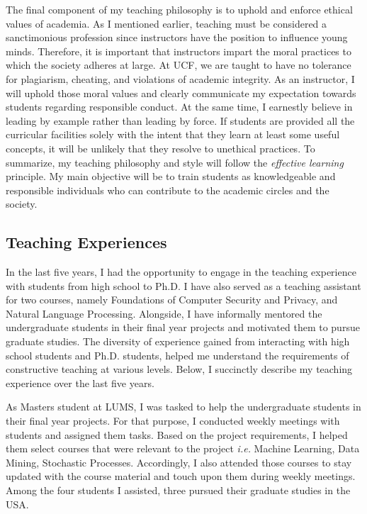 \documentclass{NSF}
\newcommand{\ie}{{\em i.e.}\xspace}
\begin{document}
The final component of my teaching philosophy is to uphold and enforce ethical values of academia. As I mentioned earlier, teaching must be considered a sanctimonious profession since instructors have the position to influence young minds. Therefore, it is important that instructors impart the moral practices to which the society adheres at large. At UCF, we are taught to have no tolerance for plagiarism, cheating, and violations of academic integrity. As an instructor, I will uphold those moral values and clearly communicate my expectation towards students regarding responsible conduct. At the same time, I earnestly believe in leading by example rather than leading by force. If students are provided all the curricular facilities solely with the intent that they learn at least some useful concepts, it will be unlikely that they resolve to unethical practices. To summarize, my teaching philosophy and style will follow the {\em effective learning} principle. My main objective will be to train students as knowledgeable and responsible individuals who can contribute to the academic circles and the society. 




\subsection*{Teaching Experiences}
In the last five years, I had the opportunity to engage in the teaching experience with students from high school to Ph.D. I have also served as a teaching assistant for two courses, namely Foundations of Computer Security and Privacy, and Natural Language Processing. Alongside, I have informally mentored the undergraduate students in their final year projects and motivated them to pursue graduate studies. The diversity of experience gained from interacting with high school students and Ph.D. students, helped me understand the requirements of constructive teaching at various levels. Below, I succinctly describe my teaching experience over the last five years.

As Masters student at LUMS, I was tasked to help the undergraduate students in their final year projects. For that purpose, I conducted weekly meetings with students and assigned them tasks. Based on the project requirements, I helped them select courses that were relevant to the project \ie Machine Learning, Data Mining, Stochastic Processes. Accordingly, I also attended those courses to stay updated with the course material and touch upon them during weekly meetings. Among the four students I assisted, three pursued their graduate studies in the USA.
\end{document}
